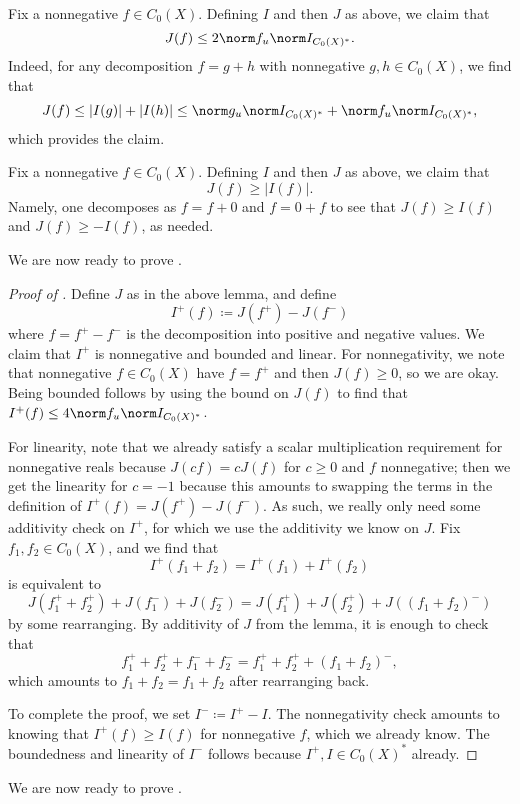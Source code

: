\documentclass[../notes.tex]{subfiles}
\begin{document}
\begin{remark}
	Fix a nonnegative $f\in C_0(X)$. Defining $I$ and then $J$ as above, we claim that
	\[J(f)\le2\norm f_u\norm I_{C_0(X)^*}.\]
	Indeed, for any decomposition $f=g+h$ with nonnegative $g,h\in C_0(X)$, we find that
	\[J(f)\le\left|I(g)\right|+\left|I(h)\right|\le\norm g_u\norm I_{C_0(X)^*}+\norm f_u\norm I_{C_0(X)^*},\]
	which provides the claim.
\end{remark}
\begin{remark}
	Fix a nonnegative $f\in C_0(X)$. Defining $I$ and then $J$ as above, we claim that
	\[J(f)\ge\left|I(f)\right|.\]
	Namely, one decomposes as $f=f+0$ and $f=0+f$ to see that $J(f)\ge I(f)$ and $J(f)\ge-I(f)$, as needed.
\end{remark}
We are now ready to prove .
\begin{proof}[Proof of ]
	Define $J$ as in the above lemma, and define
	\[I^+(f)\coloneqq J(f^+)-J(f^-)\]
	where $f=f^+-f^-$ is the decomposition into positive and negative values. We claim that $I^+$ is nonnegative and bounded and linear. For nonnegativity, we note that nonnegative $f\in C_0(X)$ have $f=f^+$ and then $J(f)\ge0$, so we are okay. Being bounded follows by using the bound on $J(f)$ to find that $I^+(f)\le4\norm f_u\norm I_{C_0(X)^*}$.
	
	For linearity, note that we already satisfy a scalar multiplication requirement for nonnegative reals because $J(cf)=cJ(f)$ for $c\ge0$ and $f$ nonnegative; then we get the linearity for $c=-1$ because this amounts to swapping the terms in the definition of $I^+(f)=J(f^+)-J(f^-)$. As such, we really only need some additivity check on $I^+$, for which we use the additivity we know on $J$. Fix $f_1,f_2\in C_0(X)$, and we find that
	\[I^+(f_1+f_2)=I^+(f_1)+I^+(f_2)\]
	is equivalent to
	\[J(f_1^++f_2^+)+J(f_1^-)+J(f_2^-)=J(f_1^+)+J(f_2^+)+J((f_1+f_2)^-)\]
	by some rearranging. By additivity of $J$ from the lemma, it is enough to check that
	\[f_1^++f_2^++f_1^-+f_2^-=f_1^++f_2^++(f_1+f_2)^-,\]
	which amounts to $f_1+f_2=f_1+f_2$ after rearranging back.

	To complete the proof, we set $I^-\coloneqq I^+-I$. The nonnegativity check amounts to knowing that $I^+(f)\ge I(f)$ for nonnegative $f$, which we already know. The boundedness and linearity of $I^-$ follows because $I^+,I\in C_0(X)^*$ already.
\end{proof}
We are now ready to prove .
\rrtwothm*
\end{document}
